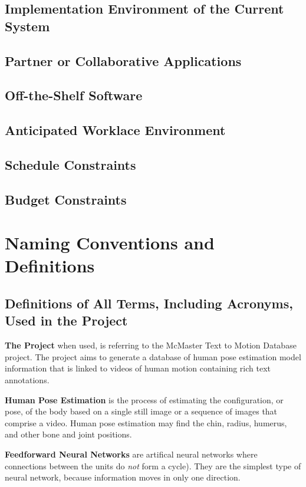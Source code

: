 \documentclass{scrreprt}
\begin{document}
\subsection{Implementation Environment of the Current System}

\subsection{Partner or Collaborative Applications}

\subsection{Off-the-Shelf Software}

\subsection{Anticipated Worklace Environment}

\subsection{Schedule Constraints}

\subsection{Budget Constraints}

\section{Naming Conventions and Definitions}

\subsection{Definitions of All Terms, Including Acronyms, Used in the Project}

\textbf{The Project} when used, is referring to the McMaster Text to Motion
Database project. The project aims to generate a database of human pose
estimation model information that is linked to videos of human motion
containing rich text annotations.

\textbf{Human Pose Estimation} is the process of estimating the configuration,
or pose, of the body based on a single still image or a sequence of images that
comprise a video. Human pose estimation may find the chin, radius, humerus, and
other bone and joint positions.

\textbf{Feedforward Neural Networks} are artifical neural networks where
connections between the units do \textit{not} form a cycle). They are the
simplest type of neural network, because information moves in only one
direction.
\end{document}
